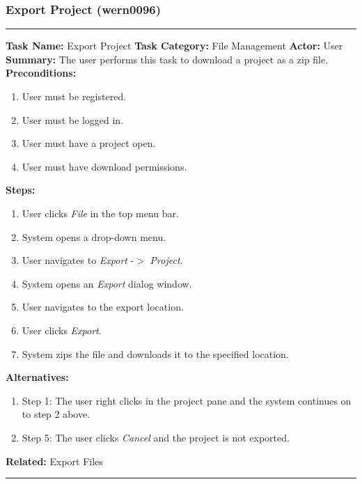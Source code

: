 \documentclass[11pt]{report}
\begin{document}
\subsubsection{Export Project (wern0096)}
\vspace{2pt}
\hrule
\vspace{8pt}
	\noindent\textbf{Task Name:} Export Project \newline
	\textbf{Task Category:} File Management \newline
	\textbf{Actor:} User \newline
	\textbf{Summary:} The user performs this task to download a project as a zip file. \newline
	\textbf{Preconditions:}
	\begin{enumerate}
		\item User must be registered.
		\item User must be logged in.
		\item User must have a project open.
		\item User must have download permissions.
	\end{enumerate}
	\textbf{Steps:}
	\begin{enumerate}
		\item User clicks \textit{File} in the top menu bar.
		\item System opens a drop-down menu.
		\item User navigates to \textit{Export} -$>$ \textit{Project}.
		\item System opens an \textit{Export} dialog window.
		\item User navigates to the export location.
		\item User clicks \textit{Export}.
		\item System zips the file and downloads it to the specified location.
	\end{enumerate}
	\textbf{Alternatives:}
	\begin{enumerate}
		\item Step 1: The user right clicks in the project pane and the system continues on to step 2 above.
		\item Step 5: The user clicks \textit{Cancel} and the project is not exported.
	\end{enumerate}
	\textbf{Related:} Export Files
\vspace{8pt}
\hrule
\newpage
\end{document}

